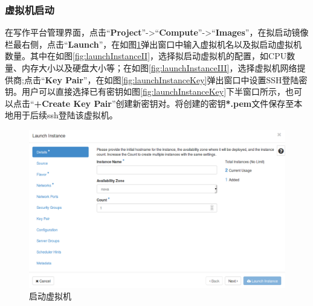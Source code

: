 \documentclass[12pt]{article}
\begin{document}
\subsubsection{虚拟机启动}
在写作平台管理界面，点击``\textbf{Project}''->``\textbf{Compute}''->``\textbf{Images}''，在拟启动镜像栏最右侧，点击``\textbf{Launch}''，在如图\ref{fig:launchInstance}弹出窗口中输入虚拟机名以及拟启动虚拟机数量。其中在如图\ref{fig:launchInstanceII}，选择拟启动虚拟机的配置，如CPU数量、内存大小以及硬盘大小等；在如图\ref{fig:launchInstanceIII}，选择虚拟机网络提供商;点击``\textbf{Key Pair}''，在如图\ref{fig:launchInstanceKey}弹出窗口中设置SSH登陆密钥。用户可以直接选择已有密钥如图\ref{fig:launchInstanceKey}下半窗口所示，也可以点击``\textbf{+Create Key Pair}''创建新密钥对。将创建的密钥\textbf{*.pem}文件保存至本地用于后续ssh登陆该虚拟机。
\begin{figure}[!htb]
\centering
\includegraphics[width=6in]{./figures/LaunchInstance}
\caption{启动虚拟机}
\label{fig:launchInstance}
\end{figure}
\end{document}
